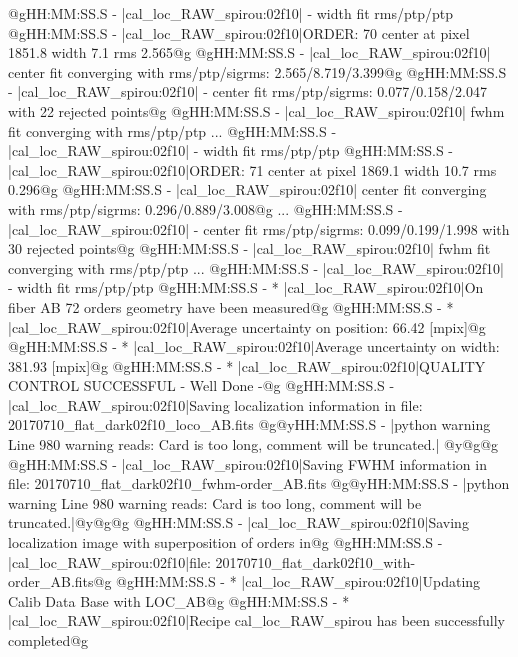 \begin{cmdboxprintspecial}[fontupper=\tiny, fontlower=\tiny]
@gHH:MM:SS.S -   |cal_loc_RAW_spirou:02f10| - width  fit rms/ptp/ptp%
@gHH:MM:SS.S -   |cal_loc_RAW_spirou:02f10|ORDER: 70 center at pixel 1851.8 width 7.1 rms 2.565@g
@gHH:MM:SS.S -   |cal_loc_RAW_spirou:02f10|      center fit converging with rms/ptp/sigrms: 2.565/8.719/3.399@g
@gHH:MM:SS.S -   |cal_loc_RAW_spirou:02f10| - center fit rms/ptp/sigrms: 0.077/0.158/2.047 with 22 rejected points@g
@gHH:MM:SS.S -   |cal_loc_RAW_spirou:02f10|      fwhm fit converging with rms/ptp/ptp%
...
@gHH:MM:SS.S -   |cal_loc_RAW_spirou:02f10| - width  fit rms/ptp/ptp%
@gHH:MM:SS.S -   |cal_loc_RAW_spirou:02f10|ORDER: 71 center at pixel 1869.1 width 10.7 rms 0.296@g
@gHH:MM:SS.S -   |cal_loc_RAW_spirou:02f10|      center fit converging with rms/ptp/sigrms: 0.296/0.889/3.008@g
...
@gHH:MM:SS.S -   |cal_loc_RAW_spirou:02f10| - center fit rms/ptp/sigrms: 0.099/0.199/1.998 with 30 rejected points@g
@gHH:MM:SS.S -   |cal_loc_RAW_spirou:02f10|      fwhm fit converging with rms/ptp/ptp%
...
@gHH:MM:SS.S -   |cal_loc_RAW_spirou:02f10| - width  fit rms/ptp/ptp%
@gHH:MM:SS.S - * |cal_loc_RAW_spirou:02f10|On fiber AB 72 orders geometry have been measured@g
@gHH:MM:SS.S - * |cal_loc_RAW_spirou:02f10|Average uncertainty on position: 66.42 [mpix]@g
@gHH:MM:SS.S - * |cal_loc_RAW_spirou:02f10|Average uncertainty on width: 381.93 [mpix]@g
@gHH:MM:SS.S - * |cal_loc_RAW_spirou:02f10|QUALITY CONTROL SUCCESSFUL - Well Done -@g
@gHH:MM:SS.S -   |cal_loc_RAW_spirou:02f10|Saving localization information in file: 20170710_flat_dark02f10_loco_AB.fits
@g@yHH:MM:SS.S - \@ |python warning Line 980  warning reads: Card is too long, comment will be truncated.| @y@g@g
@gHH:MM:SS.S -   |cal_loc_RAW_spirou:02f10|Saving FWHM information in file: 20170710_flat_dark02f10_fwhm-order_AB.fits
@g@yHH:MM:SS.S - \@ |python warning Line 980  warning reads: Card is too long, comment will be truncated.|@y@g@g
@gHH:MM:SS.S -   |cal_loc_RAW_spirou:02f10|Saving localization image with superposition of orders in@g
@gHH:MM:SS.S -   |cal_loc_RAW_spirou:02f10|file: 20170710_flat_dark02f10_with-order_AB.fits@g
@gHH:MM:SS.S - * |cal_loc_RAW_spirou:02f10|Updating Calib Data Base with LOC_AB@g
@gHH:MM:SS.S - * |cal_loc_RAW_spirou:02f10|Recipe cal_loc_RAW_spirou has been successfully completed@g
\end{cmdboxprintspecial}


\newpage
